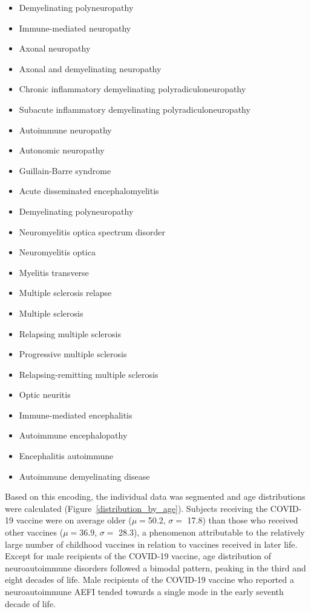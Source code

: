 \documentclass[idr,communication,submit,oneauthor,pdftex]{Definitions/mdpi}
\begin{document}
\begin{itemize}
    \item Demyelinating polyneuropathy
    \item Immune-mediated neuropathy
    \item Axonal neuropathy
    \item Axonal and demyelinating neuropathy
    \item Chronic inflammatory demyelinating polyradiculoneuropathy
    \item Subacute inflammatory demyelinating polyradiculoneuropathy
    \item Autoimmune neuropathy
    \item Autonomic neuropathy
    \item Guillain-Barre syndrome
    \item Acute disseminated encephalomyelitis
    \item Demyelinating polyneuropathy
    \item Neuromyelitis optica spectrum disorder
    \item Neuromyelitis optica
    \item Myelitis transverse
    \item Multiple sclerosis relapse
    \item Multiple sclerosis
    \item Relapsing multiple sclerosis
    \item Progressive multiple sclerosis
    \item Relapsing-remitting multiple sclerosis
    \item Optic neuritis
    \item Immune-mediated encephalitis
    \item Autoimmune encephalopathy
    \item Encephalitis autoimmune
    \item Autoimmune demyelinating disease
\end{itemize}

Based on this encoding, the individual data was segmented and age distributions were calculated
(Figure~\ref{distribution_by_age}). Subjects receiving the COVID-19 vaccine were on average older ($\mu = $50.2, $\sigma =$
17.8) than those who received other vaccines  ($\mu = $36.9, $\sigma =$ 28.3), a phenomenon attributable to the
relatively large number of childhood vaccines in relation to vaccines received in later life. Except for male
recipients of the COVID-19 vaccine, age distribution of neuroautoimmune disorders followed a bimodal pattern, peaking
in the third and eight decades of life. Male recipients of the COVID-19 vaccine who reported a neuroautoimmune AEFI
tended towards a single mode in the early seventh decade of life.
\end{document}
